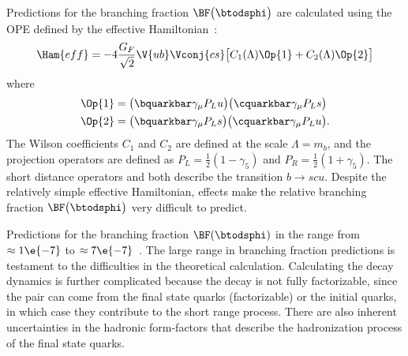 Predictions for the branching fraction $\BF\big(\btodsphi\big)$ are calculated using the OPE defined
by the effective Hamiltonian~\cite{Zou:2009zza,Mohanta:2002wf,PhysRevD.76.057701,Lu:2001yz}:
\begin{equation}
  \Ham{eff}=
  -4\frac{G_F}{\sqrt{2}} \V{ub}\Vconj{cs}
  \big[
    C_1(\Lambda)\Op{1}+C_2(\Lambda)\Op{2}
    \big]
\end{equation}
where
\begin{align}
  \Op{1} &= \big(\bquarkbar\gamma_\mu P_Lu\big) \big(\cquarkbar\gamma_\mu P_Ls\big) \nonumber\\
  \Op{2} &= \big(\bquarkbar\gamma_\mu P_Ls\big) \big(\cquarkbar\gamma_\mu P_Lu\big).
\end{align}
The Wilson coefficients $C_1$ and $C_2$ are defined at the scale $\Lambda=m_b$,
and the projection operators are defined as $P_L=\tfrac12(1-\gamma_5)$ and
$P_R=\tfrac12(1+\gamma_5)$.
The short distance operators  and  both describe the transition $b\!\to scu$.
Despite the relatively simple effective Hamiltonian, \QCD effects make the relative branching
fraction $\BF\big(\btodsphi\big)$ very difficult to predict.

Predictions for the branching fraction $\BF(\btodsphi)$ in the \sm range from
$\approx1\e{-7}$ to
$\approx7\e{-7}$~\cite{Zou:2009zza,Mohanta:2002wf,PhysRevD.76.057701,Lu:2001yz}.
The large range in branching fraction predictions is testament to the difficulties in the
theoretical calculation.
Calculating the decay dynamics is further complicated because the decay \btodsphi is not fully
factorizable, since the \ssbar pair can come from the final state quarks (factorizable) or the
initial quarks, in which case they contribute to the short range process.
There are also inherent uncertainties in the hadronic form-factors that describe the hadronization
process of the final state quarks.

